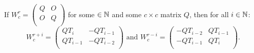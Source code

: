 \begin{lemma}\label{mirror}
If $W_{c}^{r} = \left(\begin{matrix} Q & O \\ O & Q \\\end{matrix}\right)$
for some $\in\mathbb{N}$ and some $c\times c$ matrix $Q$, then for all $i\in\mathbb{N}$:
  \[
  W_{c}^{r+i} = \left(\begin{matrix}QT_{i} & -QT_{i-1} \\ QT_{i-1} & -QT_{i-2} \\\end{matrix}\right)
	  \textrm{\ \ and\ \ }
  W_{c}^{r-i} = \left(\begin{matrix} -QT_{i-2} & QT_{i-1} \\ -QT_{i-1} & QT_{i} \\\end{matrix}\right).
  \]
\end{lemma}


